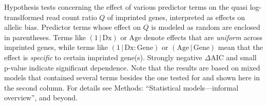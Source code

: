 \documentclass[letterpaper]{article}
\begin{document}
Hypothesis tests concerning the effect of various predictor terms on
the quasi log-translformed read count ratio \(Q\) of imprinted genes,
interpreted as effects on allelic bias.  Predictor terms whose effect on \(Q\)
is modeled as random are enclosed in parentheses.  Terms like
\((1\,|\,\mathrm{Dx})\) or \(\mathrm{Age}\) denote effects that are
\emph{uniform} across imprinted genes, while terms like
\((1\,|\,\mathrm{Dx}:\mathrm{Gene})\) or \((\mathrm{Age}\,|\,\mathrm{Gene})\)
mean that the effect is \emph{specific} to certain imprinted gene(s). Strongly
negative \(\Delta\mathrm{AIC}\) and small p-value indicate significant
dependence.  Note that the results are based on mixed models that contained
several terms besides the one tested for and shown here in the second column.
For details see Methods: ``Statistical models---informal overview'',
and beyond.
\end{document}
